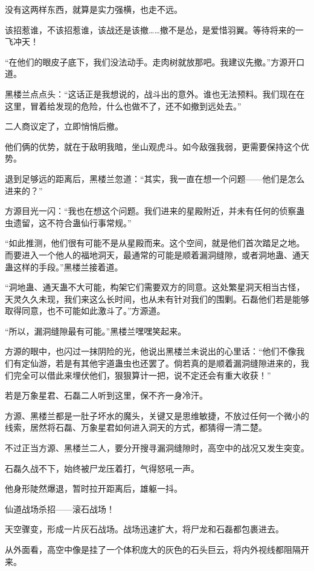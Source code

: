 \begin{this_body}
没有这两样东西，就算是实力强横，也走不远。

该招惹谁，不该招惹谁，该战还是该撤……撤不是怂，是爱惜羽翼。等待将来的一飞冲天！

“在他们的眼皮子底下，我们没法动手。走肉树就放那吧。我建议先撤。”方源开口道。

黑楼兰点点头：“这话正是我想说的，战斗出的意外。谁也无法预料。我们现在在这里，冒着给发现的危险，什么也做不了，还不如撤到远处去。”

二人商议定了，立即悄悄后撤。

他们俩的优势，就在于敌明我暗，坐山观虎斗。如今敌强我弱，更需要保持这个优势。

退到足够远的距离后，黑楼兰忽道：“其实，我一直在想一个问题——他们是怎么进来的？”

方源目光一闪：“我也在想这个问题。我们进来的星殿附近，并未有任何的侦察蛊虫遗留，这不符合蛊仙行事常规。”

“如此推测，他们很有可能不是从星殿而来。这个空间，就是他们首次踏足之地。而要进入一个他人的福地洞天，最通常的可能是顺着漏洞缝隙，或者洞地蛊、通天蛊这样的手段。”黑楼兰接着道。

“洞地蛊、通天蛊不大可能，构架它们需要双方的同意。这处繁星洞天相当古怪，天灵久久未现，我们来这么长时间，也从未有针对我们的围剿。石磊他们若是能够取得同意，也不可能如此激斗了。”方源道。

“所以，漏洞缝隙最有可能。”黑楼兰嘿嘿笑起来。

方源的眼中，也闪过一抹阴险的光，他说出黑楼兰未说出的心里话：“他们不像我们有定仙游，若是有其他宇道蛊虫也还罢了。倘若真的是顺着漏洞缝隙进来的，我们完全可以借此来埋伏他们，狠狠算计一把，说不定还会有重大收获！”

若是万象星君、石磊二人听到这里，保不齐一身冷汗。

方源、黑楼兰都是一肚子坏水的魔头，关键又是思维敏捷，不放过任何一个微小的线索，居然将石磊、万象星君如何进入洞天的方式，都猜得一清二楚。

不过正当方源、黑楼兰二人，要分开搜寻漏洞缝隙时，高空中的战况又发生突变。

石磊久战不下，始终被尸龙压着打，气得怒吼一声。

他身形陡然爆退，暂时拉开距离后，雄躯一抖。

仙道战场杀招——滚石战场！

天空骤变，形成一片灰石战场。战场迅速扩大，将尸龙和石磊都包裹进去。

从外面看，高空中像是挂了一个体积庞大的灰色的石头巨云，将内外视线都阻隔开来。


\end{this_body}
